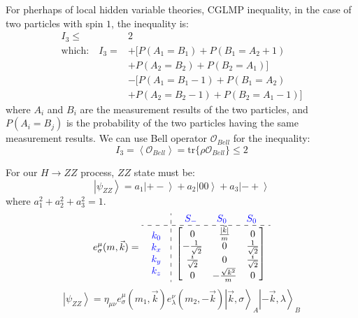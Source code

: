 \documentclass{article}
\newcommand{\ket}[1]{\left|#1\right\rangle}
\newcommand{\braket}[1]{\left\langle#1\right\rangle}
\begin{document}
For pherhaps of local hidden variable theories, CGLMP inequality\cite{dalton2021cglmp}, in the case of two particles with spin \(1\), the inequality\cite{Collins_2002} is:
\begin{align*}
    I_3\leq &2 \\
    \textrm{which:}\quad I_3 = &+[P(A_1=B_1)+P(B_1=A_2+1)\\
          &+P(A_2=B_2)+P(B_2=A_1)]\\
          &-[P(A_1=B_1-1)+P(B_1=A_2)\\
          &+P(A_2=B_2-1)+P(B_2=A_1-1)]
\end{align*}
where \(A_i\) and \(B_i\) are the measurement results of the two particles, and \(P(A_i=B_j)\) is the probability of the two particles having the same measurement results. We can use Bell operator \(\mathcal{O}_{Bell}\) for the inequality:
\[I_3=\braket{\mathcal{O}_{Bell}}=\mathrm{tr}\{\rho \mathcal{O}_{Bell} \}\leqslant 2\]

For our \(H\rightarrow ZZ\) process, \(ZZ\) state must be:
\[\ket{\psi_{ZZ}}=a_1\ket{+-}+a_2\ket{00}+a_3\ket{-+}\]
where \(a_1^2+a_2^2+a_3^2=1\). 
\[e_\sigma^\mu(m,\vec{k})=\begin{array}{c:c}
	\,\, &		{\color[RGB]{0,0,255}\begin{matrix}
	S_-&	\quad S_0&		\quad S_0\\
\end{matrix}}\\\hdashline{\color[RGB]{0, 0, 255} \begin{array}{c}k_0\\k_x\\k_y\\k_z\\
\end{array}}&		\left[ \begin{matrix}0&		\frac{|\vec{k}|}{m}&		0\\-\frac{1}{\sqrt{2}}&		0&		\frac{1}{\sqrt{2}}\\\frac{i }{\sqrt{2}}&		0&		\frac{i}{\sqrt{2}}\\0&		-\frac{\sqrt{k^2}}{m}&		0\\
\end{matrix} \right]\\
\end{array}\]
\[\ket{\psi_{ZZ}}=\eta_{\mu\nu}e_\sigma^\mu(m_1,\vec{k})e_\lambda^\nu(m_2,-\vec{k})\ket{\vec{k},\sigma}_A\ket{-\vec{k},\lambda}_B \]
\end{document}
